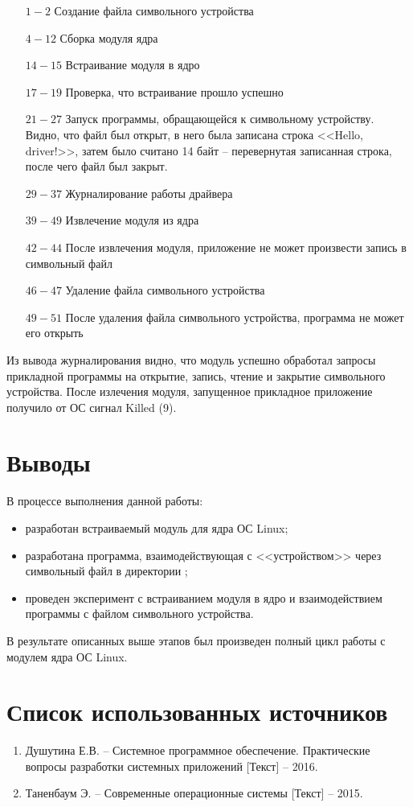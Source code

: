 \begin{enumerate}
	\item[$1-2$] Создание файла символьного устройства
	\item[$4-12$] Сборка модуля ядра
	\item[$14-15$] Встраивание модуля в ядро
	\item[$17-19$] Проверка, что встраивание прошло успешно
	\item[$21-27$] Запуск программы, обращающейся к символьному устройству. Видно, что файл был открыт, в него была записана строка <<Hello, driver!>>, затем было считано 14 байт -- перевернутая записанная строка, после чего файл был закрыт.
	\item[$29-37$] Журналирование работы драйвера
	\item[$39-49$] Извлечение модуля из ядра
	\item[$42-44$] После извлечения модуля, приложение не может произвести запись в символьный файл
	\item[$46-47$] Удаление файла символьного устройства
	\item[$49-51$] После удаления файла символьного устройства, программа не может его открыть
\end{enumerate}

Из вывода журналирования видно, что модуль успешно обработал запросы прикладной программы на открытие, запись, чтение и закрытие символьного устройства. После излечения модуля, запущенное прикладное приложение получило от ОС сигнал Killed (9).

\newpage

\section{Выводы}

В процессе выполнения данной работы:

\begin{itemize}
	\item разработан встраиваемый модуль для ядра ОС Linux; 
	\item разработана программа, взаимодействующая с <<устройством>> через символьный файл в директории ;
	\item проведен эксперимент с встраиванием модуля в ядро и взаимодействием программы с файлом символьного устройства.
\end{itemize}

В результате описанных выше этапов был произведен полный цикл работы с модулем ядра ОС Linux.

\section*{Список использованных источников}

\begin{enumerate}
	\item Душутина Е.В. -- Системное программное обеспечение. Практические вопросы разработки системных приложений [Текст] -- 2016.
	\item Таненбаум Э. -- Современные операционные системы [Текст] -- 2015.
\end{enumerate}


